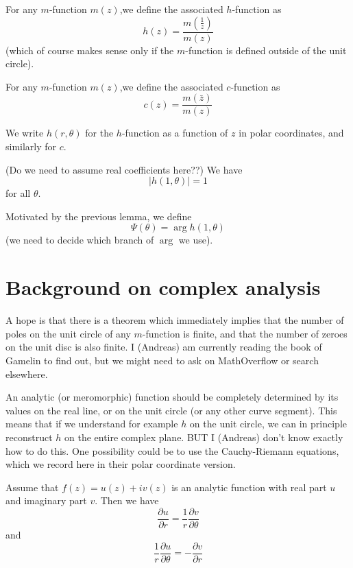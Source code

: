 \documentclass[a4paper]{amsart}
\begin{document}
\begin{definition}
For any $m$-function $m(z)$,we define the associated $h$-function as
$$ h(z) = \frac{m(\frac{1}{z})}{m(z) }  $$
(which of course makes sense only if the $m$-function is defined outside of the unit circle).
\end{definition}

\begin{definition}
For any $m$-function $m(z)$,we define the associated $c$-function as
$$c(z) = \frac{m(\bar{z})}{m(z)}$$

\end{definition}

We write $h(r, \theta)$ for the $h$-function as a function of $z$ in polar coordinates, and similarly for $c$.

\begin{lemma}
(Do we need to assume real coefficients here??) We have
$$ \vert h(1, \theta) \vert = 1 $$
for all $\theta$.
\end{lemma}

\begin{definition}
Motivated by the previous lemma, we define
$$  \Psi(\theta) = \arg h(1, \theta)   $$
(we need to decide which branch of $\arg$ we use).
\end{definition}


\section{Background on complex analysis}

A hope is that there is a theorem which immediately implies that the number of poles on the unit circle of any $m$-function is finite, and that the number of zeroes on the unit disc is also finite. I (Andreas) am currently reading the book of Gamelin to find out, but we might need to ask on MathOverflow or search elsewhere.

An analytic (or meromorphic) function should be completely determined by its values on the real line, or on the unit circle (or any other curve segment). This means that if we understand for example $h$ on the unit circle, we can in principle reconstruct $h$ on the entire complex plane. BUT I (Andreas) don't know exactly how to do this. One possibility could be to use the Cauchy-Riemann equations, which we record here in their polar coordinate version.

\begin{proposition}
Assume that $f(z) = u(z) + i v(z) $ is an analytic function with real part $u$ and imaginary part $v$. Then we have
$$  \frac{\partial u}{\partial r} = \frac{1}{r} \frac{\partial v}{\partial \theta}$$
and
$$ \frac{1}{r} \frac{\partial u}{\partial \theta} = - \frac{\partial v}{\partial r} $$
\end{proposition}
\end{document}
